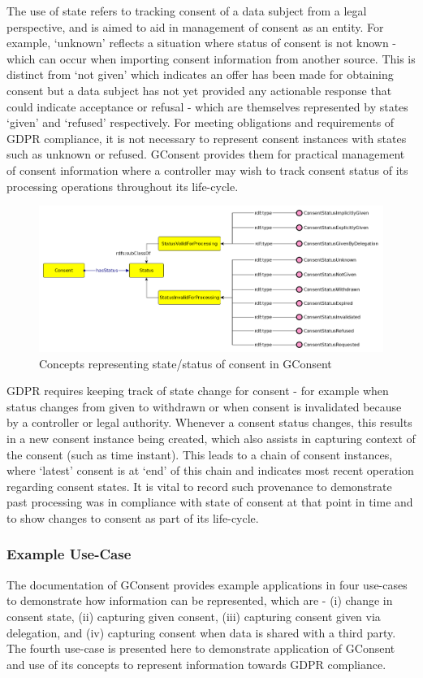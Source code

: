 The use of state refers to tracking consent of a data subject from a legal perspective, and is aimed to aid in management of consent as an entity. For example, `unknown' reflects a situation where status of consent is not known - which can occur when importing consent information from another source.
This is distinct from `not given' which indicates an offer has been made for obtaining consent but a data subject has not yet provided any actionable response that could indicate acceptance or refusal - which are themselves represented by  states `given' and `refused' respectively.
For meeting obligations and requirements of GDPR compliance, it is not necessary to represent consent instances with states such as unknown or refused.
GConsent provides them for practical management of consent information where a controller may wish to track consent status of its processing operations throughout its life-cycle.
\begin{figure}[htbp]
    \centering
    \includegraphics[width=\linewidth]{img/gconsent_status.png}
    \caption{Concepts representing state/status of consent in GConsent \cite{pandit_gconsent_2019}}
    \label{fig:vocabs:gconsent-status}
\end{figure}

GDPR requires keeping track of state change for consent - for example when status changes from given to withdrawn or when consent is invalidated because by a controller or legal authority. Whenever a consent status changes, this results in a new consent instance being created, which also assists in capturing context of the consent (such as time instant). This leads to a chain of consent instances, where `latest' consent is at `end' of this chain and indicates most recent operation regarding consent states. It is vital to record such provenance to demonstrate past processing was in compliance with state of consent at that point in time and to show changes to consent as part of its life-cycle.

\subsubsection{Example Use-Case}
The documentation of GConsent provides example applications in four use-cases to demonstrate how information can be represented, which are - (i) change in consent state, (ii) capturing given consent, (iii) capturing consent given via delegation, and (iv) capturing consent when data is shared with a third party.
The fourth use-case is presented here to demonstrate application of GConsent and use of its concepts to represent information towards GDPR compliance.

